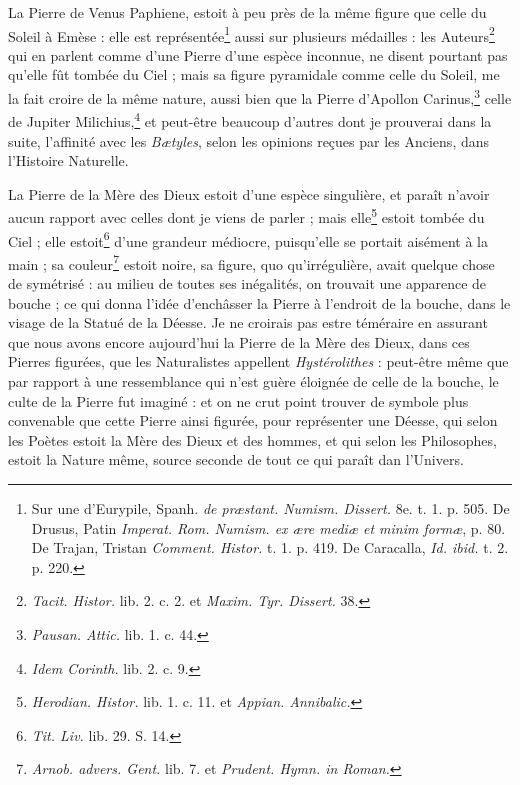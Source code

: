 \documentclass[a4paper, 11pt, oneside, polutonikogreek, french, landscape]{article}
\begin{document}
La Pierre de Venus Paphiene, estoit à peu près de la même figure que celle du Soleil à Emèse : elle est représentée\footnote{Sur une d'Eurypile, Spanh. \emph{de præstant. Numism. Dissert.} 8e. t. 1. p. 505. De Drusus, Patin \emph{Imperat. Rom. Numism. ex ære mediæ et minim formæ}, p. 80. De Trajan, Tristan \emph{Comment. Histor.} t. 1. p. 419. De Caracalla, \emph{Id. ibid.} t. 2. p. 220.} aussi sur plusieurs médailles : les Auteurs\footnote{\emph{Tacit. Histor.} lib. 2. c. 2. et \emph{Maxim. Tyr. Dissert.} 38.} qui en parlent comme d'une Pierre d'une espèce inconnue, ne disent pourtant pas qu'elle fût tombée du Ciel ; mais sa figure pyramidale comme celle du Soleil, me la fait croire de la même nature, aussi bien que la Pierre d'Apollon Carinus,\footnote{\emph{Pausan. Attic.} lib. 1. c. 44.} celle de Jupiter Milichius,\footnote{\emph{Idem Corinth.} lib. 2. c. 9.} et peut-être beaucoup d'autres dont je prouverai dans la suite, l'affinité avec les \emph{Bætyles}, selon les opinions reçues par les Anciens, dans l'Histoire Naturelle.

La Pierre de la Mère des Dieux estoit d'une espèce singulière, et paraît n'avoir aucun rapport avec celles dont je viens de parler ; mais elle\footnote{\emph{Herodian. Histor.} lib. 1. c. 11. et \emph{Appian. Annibalic.}} estoit tombée du Ciel ; elle estoit\footnote{\emph{Tit. Liv.} lib. 29. S. 14.} d'une grandeur médiocre, puisqu'elle se portait aisément à la main ; sa couleur\footnote{\emph{Arnob. advers. Gent.} lib. 7. et \emph{Prudent. Hymn. in Roman.}} estoit noire, sa figure, quo qu’irrégulière, avait quelque chose de symétrisé : au milieu de toutes ses inégalités, on trouvait une apparence de bouche ; ce qui donna l'idée d'enchâsser la Pierre à l'endroit de la bouche, dans le visage de la Statué de la Déesse. Je ne croirais pas estre téméraire en assurant que nous avons encore aujourd’hui la Pierre de la Mère des Dieux, dans ces Pierres figurées, que les Naturalistes appellent \emph{Hystérolithes} : peut-être même que par rapport à une ressemblance qui n'est guère éloignée de celle de la bouche, le culte de la Pierre fut imaginé : et on ne crut point trouver de symbole plus convenable que cette Pierre ainsi figurée, pour représenter une Déesse, qui selon les Poètes estoit la Mère des Dieux et des hommes, et qui selon les Philosophes, estoit la Nature même, source seconde de tout ce qui paraît dan l'Univers.
\end{document}
